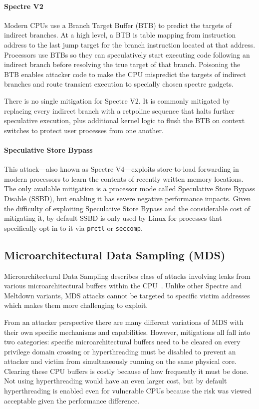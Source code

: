 \paragraph{Spectre V2~\cite{kocher:spectre}}

Modern CPUs use a Branch Target Buffer (BTB) to predict the targets of indirect branches.
At a high level, a BTB is table mapping from instruction address to the last jump target for the branch instruction located at that address.
Processors use BTBs so they can speculatively start executing code following an indirect branch before resolving the true target of that branch.
Poisoning the BTB enables attacker code to make the CPU mispredict the targets of indirect branches and route transient execution to specially chosen spectre gadgets.

There is no single mitigation for Spectre V2.
It is commonly mitigated by replacing every indirect branch with a retpoline sequence \cite{intel:retpoline} that halts further speculative execution, plus additional kernel logic to flush the BTB on context switches to protect user processes from one another.

\paragraph{Speculative Store Bypass~\cite{horn:speculative-store-bypass}}
This attack---also known as Spectre V4---exploits store-to-load forwarding in modern processors to learn the contents of recently written memory locations.
The only available mitigation is a processor mode called Speculative Store Bypass Disable (SSBD), but enabling it has severe negative performance impacts.
Given the difficulty of exploiting Speculative Store Bypass and the considerable cost of mitigating it, by default SSBD is only used by Linux for processes that specifically opt in to it via \texttt{prctl} or \texttt{seccomp}.

\subsection{Microarchitectural Data Sampling (MDS)}
Microarchitectural Data Sampling describes class of attacks involving leaks from various microarchitectural buffers within the CPU~\cite{canella:fallout, schwarz:zombieload,schaik:ridl}.
Unlike other Spectre and Meltdown variants, MDS attacks cannot be targeted to specific victim addresses which makes them more challenging to exploit.

From an attacker perspective there are many different variations of MDS with their own specific mechanisms and capabilities.
However, mitigations all fall into two categories: specific microarchitectural buffers need to be cleared on every privilege domain crossing or hyperthreading must be disabled to prevent an attacker and victim from simultaneously running on the same physical core.
Clearing these CPU buffers is costly because of how frequently it must be done.
Not using hyperthreading would have an even larger cost, but by default
hyperthreading is enabled even for vulnerable CPUs because the risk was viewed acceptable given the performance difference.


